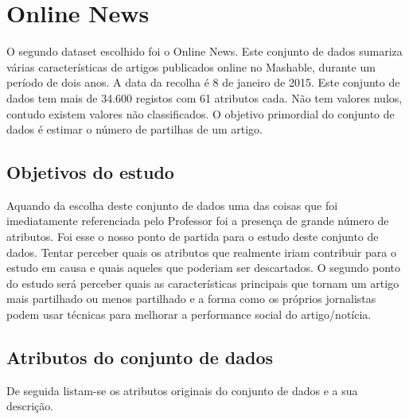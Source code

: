 \section{Online News}\label{sec:OnlineNewsChap}

O segundo dataset escolhido foi o Online News. Este conjunto de dados sumariza várias características de artigos publicados online no Mashable, durante um período de dois anos. A data da recolha é 8 de janeiro de 2015. Este conjunto de dados tem mais de 34.600 registos com 61 atributos cada. Não tem valores nulos, contudo existem valores não classificados. O objetivo primordial do conjunto de dados é estimar o número de partilhas de um artigo.

\subsection{Objetivos do estudo}

Aquando da escolha deste conjunto de dados uma das coisas que foi imediatamente referenciada pelo Professor foi a presença de grande número de atributos. Foi esse o nosso ponto de partida para o estudo deste conjunto de dados. Tentar perceber quais os atributos que realmente iriam contribuir para o estudo em causa e quais aqueles que poderiam ser descartados. \newline
O segundo ponto do estudo será perceber quais as características principais que tornam um artigo mais partilhado ou menos partilhado e a forma como os próprios jornalistas podem usar técnicas para melhorar a performance social do artigo/notícia.

\subsection{Atributos do conjunto de dados}

De seguida listam-se os atributos originais do conjunto de dados e a sua descrição.

